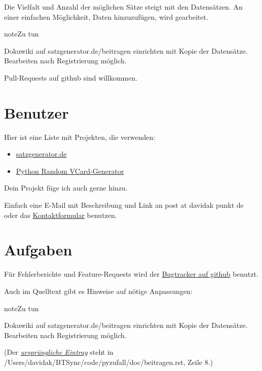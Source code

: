 \documentclass[a4paper,12pt,oneside]{sphinxmanual}
\begin{document}
Die Vielfalt und Anzahl der möglichen Sätze steigt mit den Datensätzen. An einer einfachen Möglichkeit, Daten hinzuzufügen, wird gearbeitet.

\begin{notice}{note}{Zu tun}

Dokuwiki auf satzgenerator.de/beitragen einrichten mit Kopie der Datensätze. Bearbeiten nach Registrierung möglich.
\end{notice}

Pull-Requests auf github sind willkommen.


\chapter{Benutzer}
\label{benutzer::doc}\label{benutzer:benutzer}
Hier ist eine Liste mit Projekten, die {\hyperref[funktionen:module-pyzufall]{}} verwenden:
\begin{itemize}
\item {} 
\href{http://satzgenerator.de/}{satzgenerator.de}

\item {} 
\href{https://github.com/davidak/python-random-vcard-generator}{Python Random VCard-Generator}

\end{itemize}

Dein Projekt füge ich auch gerne hinzu.

Einfach eine E-Mail mit Beschreibung und Link an post at davidak punkt de oder das \href{http://davidak.de/kontakt}{Kontaktformular} benutzen.


\chapter{Aufgaben}
\label{todo::doc}\label{todo:aufgaben}
Für Fehlerberichte und Feature-Requests wird der \href{https://github.com/davidak/pyzufall/issues}{Bugtracker auf github} benutzt.

Auch im Quelltext gibt es Hinweise auf nötige Anpassungen:

\begin{notice}{note}{Zu tun}

Dokuwiki auf satzgenerator.de/beitragen einrichten mit Kopie der Datensätze. Bearbeiten nach Registrierung möglich.
\end{notice}

(Der {\hyperref[beitragen:index-0]{\emph{ursprüngliche Eintrag}}} steht in /Users/davidak/BTSync/code/pyzufall/doc/beitragen.rst, Zeile 8.)
\end{document}
